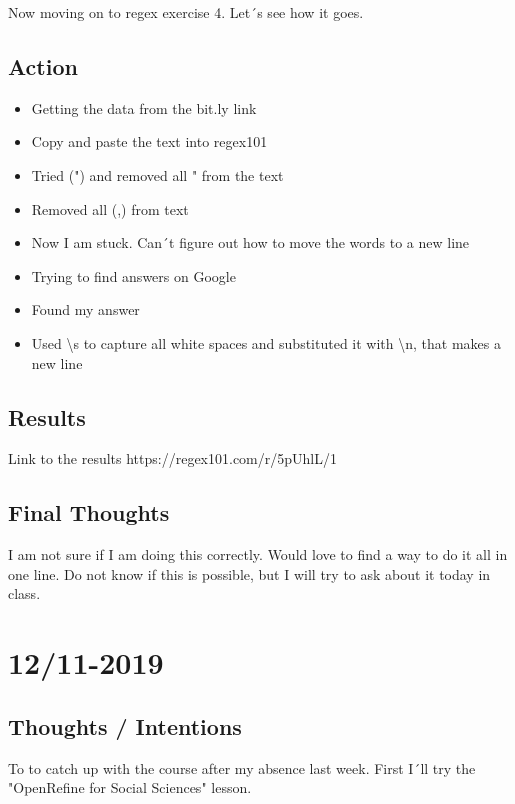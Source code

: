 \documentclass{article}
\begin{document}
\text Now moving on to regex exercise 4. Let´s see how it goes. 


\subsection{Action}

\begin{itemize}
    \item Getting the data from the bit.ly link 
    \item Copy and paste the text into regex101
    \item Tried (") and removed all " from the text
    \item Removed all (,) from text
    \item Now I am stuck. Can´t figure out how to move the words to a new line 
    \item Trying to find answers on Google
    \item Found my answer
    \item Used \textbackslash s to capture all white spaces and substituted it with \textbackslash n, that makes a new line 
\end{itemize}

\subsection{Results}

\textb Link to the results https://regex101.com/r/5pUhlL/1

\subsection{Final Thoughts}
\text I am not sure if I am doing this correctly. Would love to find a way to do it all in one line. Do not know if this is possible, but I will try to ask about it today in class. 


\section{12/11-2019}
\subsection{Thoughts / Intentions}
\text To to catch up with the course after my absence last week. First I´ll try the "OpenRefine for Social Sciences" lesson. 
\end{document}
